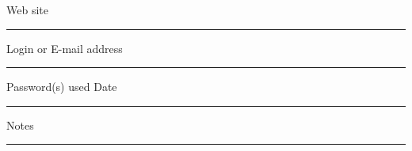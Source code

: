 \clearpage

\noindent Web site \
\vspace{-.1in} \\ \rule{\textwidth}{.2pt}
\vspace{0.5in}

\noindent Login or E-mail address \
\vspace{-.1in} \\ \rule{\textwidth}{.2pt}
\vspace{0.5in}

\noindent Password(s) used
\hspace{2in}
Date \
\vspace{-.1in} \\ \rule{\textwidth}{.2pt}
\vspace{1.5in}

\noindent Notes \
\vspace{-.1in} \\ \rule{\textwidth}{.2pt}

